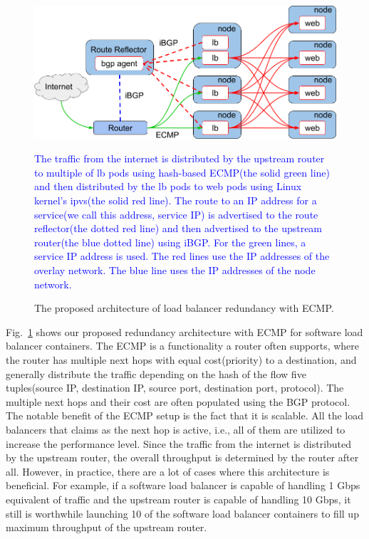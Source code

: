 \begin{figure}[tb]
\begin{center}
\includegraphics[width=\columnwidth]{Figs/ecmp.png}
\end{center}
\caption{The proposed architecture of load balancer redundancy with ECMP.}
\textcolor{blue}{
  The traffic from the internet is distributed by the upstream router to multiple of lb pods using hash-based ECMP(the solid green line) and then distributed by the lb pods to web pods using Linux kernel's ipvs(the solid red line).
  The route to an IP address for a service(we call this address, service IP) is advertised to the route reflector(the dotted red line) and then advertised to the upstream router(the blue dotted line) using iBGP.
  For the green lines, a service IP address is used. The red lines use the IP addresses of the overlay network. The blue line uses the IP addresses of the node network.
}
\label{fig:ecmp}
\end{figure}

Fig.~\ref{fig:ecmp} shows our proposed redundancy architecture with ECMP for software load balancer containers.
%
The ECMP is a functionality a router often supports, where the router has multiple next hops with equal cost(priority) to a destination, and generally distribute the traffic depending on the hash of the flow five tuples(source IP, destination IP, source port, destination port, protocol).
The multiple next hops and their cost are often populated using the BGP protocol.
%
The notable benefit of the ECMP setup is the fact that it is scalable.
All the load balancers that claims as the next hop is active, i.e., all of them are utilized to increase the performance level.
Since the traffic from the internet is distributed by the upstream router, the overall throughput is determined by the router after all.
However, in practice, there are a lot of cases where this architecture is beneficial.
For example, if a software load balancer is capable of handling 1 Gbps equivalent of traffic and the upstream router is capable of handling 10 Gbps, it still is worthwhile launching 10 of the software load balancer containers to fill up maximum throughput of the upstream router.


